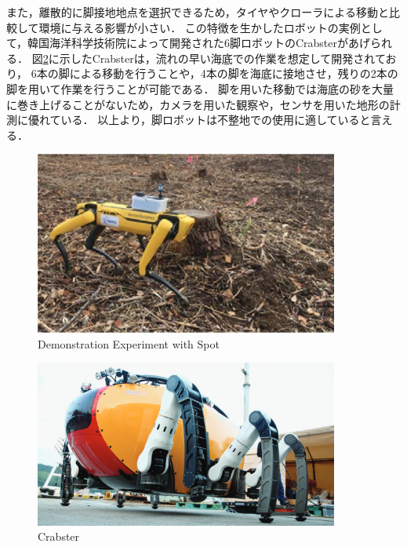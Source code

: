 また，離散的に脚接地地点を選択できるため，タイヤやクローラによる移動と比較して環境に与える影響が小さい．
この特徴を生かしたロボットの実例として，韓国海洋科学技術院によって開発された6脚ロボットのCrabster\cite{J_Kim_Dexterous_Crabster}があげられる．
図\ref{fig:crabster}に示したCrabsterは，流れの早い海底での作業を想定して開発されており，
6本の脚による移動を行うことや，4本の脚を海底に接地させ，残りの2本の脚を用いて作業を行うことが可能である．
脚を用いた移動では海底の砂を大量に巻き上げることがないため\cite{J_Kim_Little_Crabster}，カメラを用いた観察や，センサを用いた地形の計測に優れている．
以上より，脚ロボットは不整地での使用に適していると言える．

\begin{figure}[htbp]
  \begin{center}
    \includegraphics[width=100mm, clip]{figure/chapter1/NEDO.png}
   \caption{Demonstration Experiment with Spot\cite{NEDO}}
   \label{fig:nedo_spot}
  \end{center}
\end{figure}

\begin{figure}[htbp]
  \begin{center}
    \includegraphics[width=100mm, clip]{figure/chapter1/crabster.png}
   \caption{Crabster\cite{J_Kim_Dexterous_Crabster}}
   \label{fig:crabster}
  \end{center}
\end{figure}

